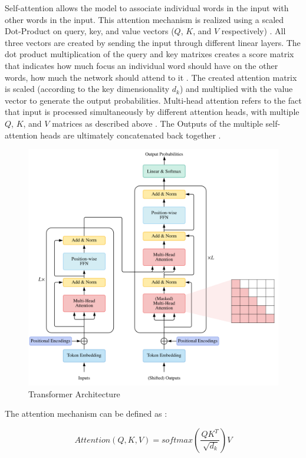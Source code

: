 Self-attention allows the model to associate individual words in the input with other words in the input.
This attention mechanism is realized using a scaled Dot-Product on query, key, and value vectors ($Q$, $K$, and $V$ respectively) \cite{vaswani2017AttentionAllYou}.
All three vectors are created by sending the input through different linear layers.
The dot product multiplication of the query and key matrixes creates a score matrix that indicates how much focus an individual word should have on the other words, \ie how much the network should attend to it \cite{vaswani2017AttentionAllYou}.
The created attention matrix is scaled (according to the key dimensionality $d_k$) and multiplied with the value vector to generate the output probabilities.
Multi-head attention refers to the fact that input is processed simultaneously by different attention heads, \ie with multiple $Q$, $K$, and $V$ matrices as described above \cite{vaswani2017AttentionAllYou}.
The Outputs of the multiple self-attention heads are ultimately concatenated back together \cite{vaswani2017AttentionAllYou}.
\newpage %
\begin{figure}[t]
  \includegraphics[width=0.8\linewidth]{images/transformer.png}
\caption[Transformers]{Transformer Architecture \cite[Figure 1, p. 3]{lin2022SurveyTransformers}} \label{fig:transformer}
\end{figure}

The attention mechanism can be defined as \cite[p.4]{vaswani2017AttentionAllYou}:

\begin{equation}
  \label{eqn:attention}
  Attention(Q,K,V)=softmax(\frac{QK^T}{\sqrt[]{d_k}})V
\end{equation}

